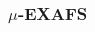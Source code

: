 \documentclass[10pt, xcolor=x11names, compress]{beamer}
\begin{document}
\begin{frame}
  \frametitle{$\mu$-EXAFS}

  \begin{columns}[T]
    \begin{column}{0.34\linewidth}



\end{column}
\end{columns}
\end{frame}
\end{document}
